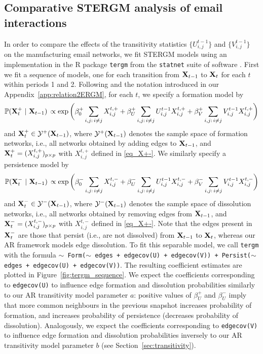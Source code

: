 \documentclass[12pt]{article}
\newcommand{\bX}{{\bf X}}
\newcommand{\0}{{\bf 0}}
\begin{document}
\subsection{Comparative STERGM analysis of email interactions} \label{sec:email.tergm}

In order to compare the effects of the transitivity statistics $\{U^{t-1}_{i,j}\}$ and $\{V^{t-1}_{i,j}\}$ on the manufacturing email networks, we fit STERGM models using an implementation in the R package \texttt{tergm} from the \texttt{statnet} suite of software \citep{statnet2025_supp}.
First we fit a sequence of models, one for each transition from ${\bf X}_{t-1}$ to ${\bf X}_t$ for each $t$ within periods 1 and 2. 
Following \cite{Krivitsky2014_supp} and the notation introduced in our Appendix~\ref{app:relation2ERGM}, for each $t$, we specify a formation model by
$$
    \mathbb{P}({\bf X}^+_t ~\vert~ {\bf X}_{t-1})\, \propto \exp\bigg( \beta^{+}_0 \sum_{i,j:\, i \neq j} X_{i,j}^{t,+} + \beta^+_U \sum_{i,j:\, i \neq j} U_{i,j}^{t-1} X_{i,j}^{t,+} + \beta^+_V \sum_{i,j:\, i \neq j} V_{i,j}^{t-1} X_{i,j}^{t,+} \bigg)
$$
and ${\bf X}^+_t \in \mathcal{Y}^{+}({\bf X}_{t-1})$, where $\mathcal{Y}^{+}({\bf X}_{t-1})$ denotes the sample space of formation networks, i.e., all networks obtained by adding edges to ${\bf X}_{t-1}$, and $\bX_t^{+}= (X_{i,j}^{t,+})_{p\times p}$ with $X_{i,j}^{t,+}$ defined in \eqref{eq_X+-}.
We similarly specify a persistence model by
$$
    \mathbb{P}({\bf X}_t^- ~\vert~ {\bf X}_{t-1})\, \propto \exp\bigg( \beta^-_0 \sum_{i,j:\, i \neq j} X_{i,j}^{t,-} + \beta^-_U \sum_{i,j:\, i \neq j} U_{i,j}^{t-1} X_{i,j}^{t,-} + \beta^-_V \sum_{i,j:\, i \neq j} V_{i,j}^{t-1} X_{i,j}^{t,-} \bigg)
$$
and ${\bf X}_t^- \in \mathcal{Y}^{-}({\bf X}_{t-1})$, where $\mathcal{Y}^{-}({\bf X}_{t-1})$ denotes the sample space of dissolution networks, i.e., all networks obtained by removing edges from $\bX_{t-1}$, and $\bX_t^{-}= (X_{i,j}^{t,-})_{p\times p}$ with $X_{i,j}^{t,-}$ defined in \eqref{eq_X+-}.
Note that the edges present in $\bX_t^{-}$ are those that persist (i.e., are not dissolved) from $\bX_{t-1}$ to $\bX_t$, whereas our AR framework models edge dissolution.
To fit this separable model, we call \texttt{tergm} with the formula \texttt{$\sim$ Form($\sim$ edges + edgecov(U) + edgecov(V)) + Persist($\sim$ edges + edgecov(U) + edgecov(V))}. The resulting coefficient estimates are plotted in Figure~\ref{fig:tergm_sequence}. 
We expect the coefficients corresponding to \texttt{edgecov(U)} to influence edge formation and dissolution probabilities similarly to our AR transitivity model parameter $a$: positive values of $\beta^+_U$ and $\beta^-_U$ imply that more common neighbours in the previous snapshot increases probability of formation, and increases probability of persistence (decreases probability of dissolution). 
Analogously, we expect the coefficients corresponding to \texttt{edgecov(V)} to influence edge formation and dissolution probabilities inversely to our AR transitivity model parameter $b$ (see Section~\ref{sec:transitivity}).
\end{document}
